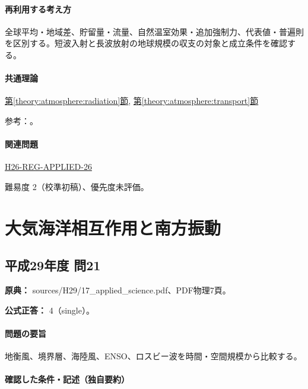 \paragraph{再利用する考え方} 全球平均・地域差、貯留量・流量、自然温室効果・追加強制力、代表値・普遍則を区別する。短波入射と長波放射の地球規模の収支の対象と成立条件を確認する。

\paragraph{共通理論} \hyperref[theory:atmosphere:radiation]{第\ref*{theory:atmosphere:radiation}節}, \hyperref[theory:atmosphere:transport]{第\ref*{theory:atmosphere:transport}節}

\par 参考：\cite{atm_nasa_budget,atm_nasa_albedo,atm_nasa_transport}。

\paragraph{関連問題} \hyperref[q:h26-reg-applied-26]{H26-REG-APPLIED-26}

\par 難易度 2（校準初稿）、優先度未評価。

\section{大気海洋相互作用と南方振動}

\subsection{平成29年度 問21}
\label{q:h29-reg-applied-21}

\noindent\textbf{原典：} sources/H29/17\_applied\_science.pdf、PDF物理7頁。

\textbf{公式正答：} 4（single）。

\paragraph{問題の要旨} 地衡風、境界層、海陸風、ENSO、ロスビー波を時間・空間規模から比較する。

\paragraph{確認した条件・記述（独自要約）}\mbox{}\par

